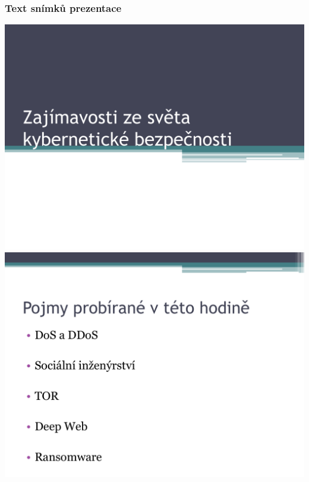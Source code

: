 \documentclass[a4paper, 12pt]{article}
\begin{document}
\subsubsection{Text snímků prezentace}
\includegraphics[scale=0.5]{SecurityFlythroughSlides/p01.pdf} \\
\vspace{0.5in}
\includegraphics[scale=0.5]{SecurityFlythroughSlides/p02.pdf} \\
\vspace{0.5in}
\end{document}
